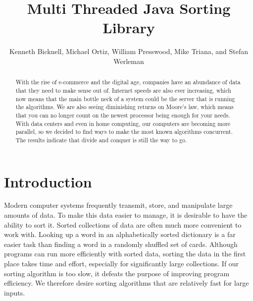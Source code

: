 \documentclass{article}
\title{Multi Threaded Java Sorting Library}
\author{
  Kenneth Bicknell, Michael Ortiz, William Presswood, Mike Triana, and \newline Stefan Werleman\\
}
\begin{document}
\maketitle

\begin{abstract}

With the rise of e-commerce and the digital age, companies have an abundance of data that they need to make sense out of. Internet speeds are also ever increasing, which now means that the main bottle neck of a system could be the server that is running the algorithms. We are also seeing diminishing returns on Moore's law, which means that you can no longer count on the newest processor being enough for your needs. With data centers and even in home computing, our computers are becoming more parallel, so we decided to find ways to make the most known algorithms concurrent. The results indicate that divide and conquer is still the way to go.
\end{abstract}


\section{Introduction}

Modern computer systems frequently transmit, store, and manipulate large amounts of data. To make this data easier to manage, it is desirable to have the ability to sort it. Sorted collections of data are often much more convenient to work with. Looking up a word in an alphabetically sorted dictionary is a far easier task than finding a word in a randomly shuffled set of cards. Although programs can run more efficiently with sorted data, sorting the data in the first place takes time and effort, especially for significantly large collections. If our sorting algorithm is too slow, it defeats the purpose of improving program efficiency. We therefore desire sorting algorithms that are relatively fast for large inputs.
\end{document}
